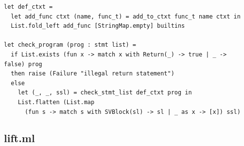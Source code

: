 \documentclass[12pt]{article}
\begin{document}
\begin{mdframed}[hidealllines=true,backgroundcolor=blue!20]
\begin{lstlisting}
let def_ctxt =
  let add_func ctxt (name, func_t) = add_to_ctxt func_t name ctxt in
  List.fold_left add_func [StringMap.empty] builtins

let check_program (prog : stmt list) =
  if List.exists (fun x -> match x with Return(_) -> true | _ -> false) prog
  then raise (Failure "illegal return statement")
  else
    let (_, _, ssl) = check_stmt_list def_ctxt prog in
    List.flatten (List.map 
      (fun s -> match s with SVBlock(sl) -> sl | _ as x -> [x]) ssl)

\end{lstlisting}
\end{mdframed}

\subsection{lift.ml}
\end{document}
